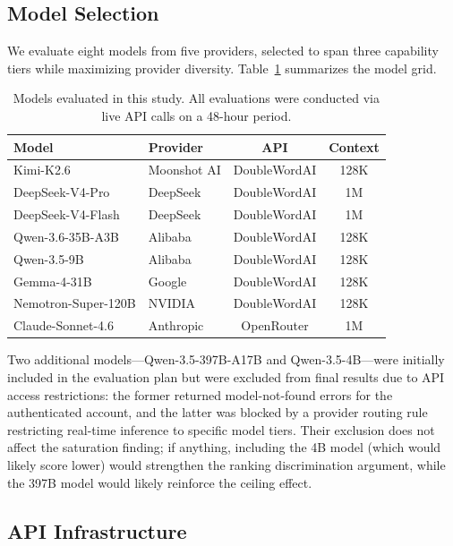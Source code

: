\documentclass[journal]{IEEEtran}
\begin{document}
\subsection{Model Selection}

We evaluate eight models from five providers, selected to span three capability tiers while maximizing provider diversity. Table~\ref{tab:models} summarizes the model grid.

\begin{table}[t]
\centering
\caption{Models evaluated in this study. All evaluations were conducted via live API calls on a 48-hour period.}
\label{tab:models}
\small
\begin{tabular}{llcc}
\toprule
\textbf{Model} & \textbf{Provider} & \textbf{API} & \textbf{Context} \\
\midrule
Kimi-K2.6 & Moonshot AI & DoubleWordAI & 128K \\
DeepSeek-V4-Pro & DeepSeek & DoubleWordAI & 1M \\
DeepSeek-V4-Flash & DeepSeek & DoubleWordAI & 1M \\
Qwen-3.6-35B-A3B & Alibaba & DoubleWordAI & 128K \\
Qwen-3.5-9B & Alibaba & DoubleWordAI & 128K \\
Gemma-4-31B & Google & DoubleWordAI & 128K \\
Nemotron-Super-120B & NVIDIA & DoubleWordAI & 128K \\
Claude-Sonnet-4.6 & Anthropic & OpenRouter & 1M \\
\bottomrule
\end{tabular}
\end{table}

Two additional models---Qwen-3.5-397B-A17B and Qwen-3.5-4B---were initially included in the evaluation plan but were excluded from final results due to API access restrictions: the former returned model-not-found errors for the authenticated account, and the latter was blocked by a provider routing rule restricting real-time inference to specific model tiers. Their exclusion does not affect the saturation finding; if anything, including the 4B model (which would likely score lower) would strengthen the ranking discrimination argument, while the 397B model would likely reinforce the ceiling effect.

\subsection{API Infrastructure}
\end{document}
